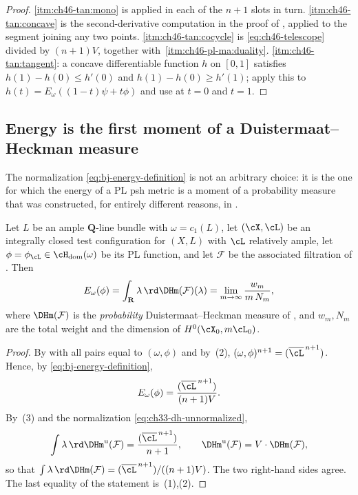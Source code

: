 \begin{proof}
\cref{itm:ch46-tan:mono} is  applied
in each of the $n+1$ slots in turn.
\cref{itm:ch46-tan:concave} is the second-derivative computation in the
proof of , applied to the segment
joining any two points.
\cref{itm:ch46-tan:cocycle} is \eqref{eq:ch46-telescope} divided by
$(n+1)V$, together with
\,\cref{itm:ch46-pl-ma:duality}.
\cref{itm:ch46-tan:tangent}: a concave differentiable function $h$ on
$[0,1]$ satisfies $h(1)-h(0)\le h'(0)$ and $h(1)-h(0)\ge h'(1)$;
apply this to $h(t)=E_\omega((1-t)\psi+t\phi)$ and use
 at $t=0$ and $t=1$.
\end{proof}

\subsection{Energy is the first moment of a Duistermaat--Heckman measure}
\label{sec:ch46-dh}

The normalization \eqref{eq:bj-energy-definition} is not an arbitrary
choice: it is the one for which the energy of a PL psh metric is a moment
of a probability measure that was constructed, for entirely different
reasons, in .

\begin{proposition}
\label{prop:ch46-energy-dh}
Let $L$ be an ample $\mathbf Q$-line bundle with
$\omega=c_1(L)$, let $(\cX,\cL)$ be an integrally closed test
configuration for $(X,L)$ with $\cL$ relatively ample, let
$\phi=\phi_{\cL}\in\cH_{\mathrm{dom}}(\omega)$ be its PL function, and
let $\mathcal F$ be the associated filtration of
.  Then
\[
 E_\omega(\phi)=\int_{\mathbf R}\lambda\,\rd\DHm(\mathcal F)(\lambda)
 =\lim_{m\to\infty}\frac{w_m}{m\,N_m},
\]
where $\DHm(\mathcal F)$ is the \emph{probability} Duistermaat--Heckman
measure of , and $w_m,N_m$ are the total
weight and the dimension of $H^0(\cX_0,m\cL_0)$.
\end{proposition}

\begin{proof}
By  with all pairs equal to
$(\omega,\phi)$ and by \,(2),
$(\omega,\phi)^{n+1}=(\overline\cL^{\,n+1})$.  Hence, by
\eqref{eq:bj-energy-definition},
\[
 E_\omega(\phi)=\frac{(\overline\cL^{\,n+1})}{(n+1)V}.
\]
By \,(3) and the normalization
\eqref{eq:ch33-dh-unnormalized},
\[
 \int\lambda\,\rd\DHm^{\mathrm u}(\mathcal F)
 =\frac{(\overline\cL^{\,n+1})}{n+1},
 \qquad
 \DHm^{\mathrm u}(\mathcal F)=V\cdot\DHm(\mathcal F),
\]
so that $\int\lambda\,\rd\DHm(\mathcal F)
=(\overline\cL^{\,n+1})/((n+1)V)$.  The two right-hand sides agree.  The
last equality of the statement is
\,(1),(2).
\end{proof}

